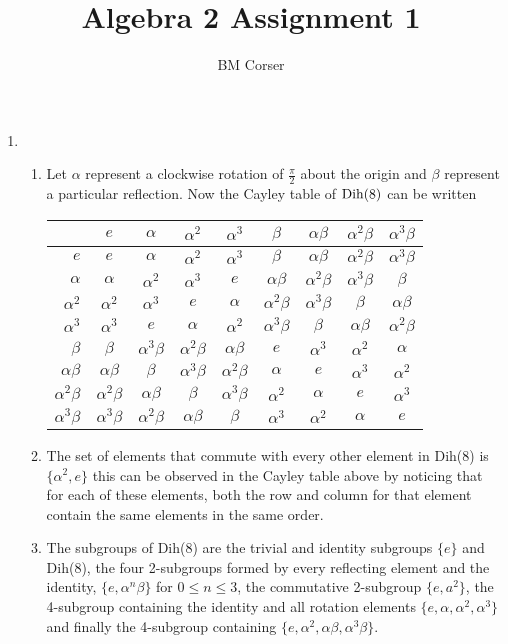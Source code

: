 \documentclass[10pt]{article}
\author{BM Corser}
\title{Algebra 2 Assignment 1}
\newcommand*{\E}{$e$}
\newcommand*{\A}{$\alpha$ }
\newcommand*{\As}{$\alpha^2$ }
\newcommand*{\Ac}{$\alpha^3$ }
\newcommand*{\B}{$\beta$ }
\newcommand*{\AB}{$\alpha\beta$ }
\newcommand*{\AsB}{$\alpha^2\beta$ }
\newcommand*{\AcB}{$\alpha^3\beta$ }
\begin{document}
  \maketitle 
  \begin{enumerate}
    \item
    \begin{enumerate}
        \item Let \A represent a clockwise rotation of $\frac{\pi}{2}$ about
          the origin and $\beta$ represent a particular reflection. Now the
          Cayley table of ${\rm Dih}(8)$ can be written

        \begin{tabular}{r|cccccccc}
               & \E   & \A   & \As  & \Ac  & \B   & \AB  & \AsB & \AcB \\ \hline
          \E   & \E   & \A   & \As  & \Ac  & \B   & \AB  & \AsB & \AcB \\
          \A   & \A   & \As  & \Ac  & \E   & \AB  & \AsB & \AcB & \B   \\
          \As  & \As  & \Ac  & \E   & \A   & \AsB & \AcB & \B   & \AB  \\
          \Ac  & \Ac  & \E   & \A   & \As  & \AcB & \B   & \AB  & \AsB \\
          \B   & \B   & \AcB & \AsB & \AB  & \E   & \Ac  & \As  & \A   \\
          \AB  & \AB  & \B   & \AcB & \AsB & \A   & \E   & \Ac  & \As  \\
          \AsB & \AsB & \AB  & \B   & \AcB & \As  & \A   & \E   & \Ac  \\
          \AcB & \AcB & \AsB & \AB  & \B   & \Ac  & \As  & \A   & \E   \\
        \end{tabular}
      \item The set of elements that commute with every other element in Dih(8)
        is $\{\alpha^2, e\}$ this can be observed in the Cayley table above by
        noticing that for each of these elements, both the row and column for
        that element contain the same elements in the same order.
      \item The subgroups of Dih(8) are the trivial and identity subgroups
        $\{e\}$ and Dih(8), the four 2-subgroups formed by every reflecting
        element and the identity, $\{e, \alpha^n\beta\}$ for $0 \leq n \leq 3$,
        the commutative 2-subgroup $\{e, a^2\}$, the 4-subgroup containing the
        identity and all rotation elements $\{e, \alpha, \alpha^2, \alpha^3\}$
        and finally the 4-subgroup containing $\{e, \alpha^2, \alpha\beta,
        \alpha^3\beta\}$.


\end{enumerate}
\end{enumerate}
\end{document}
